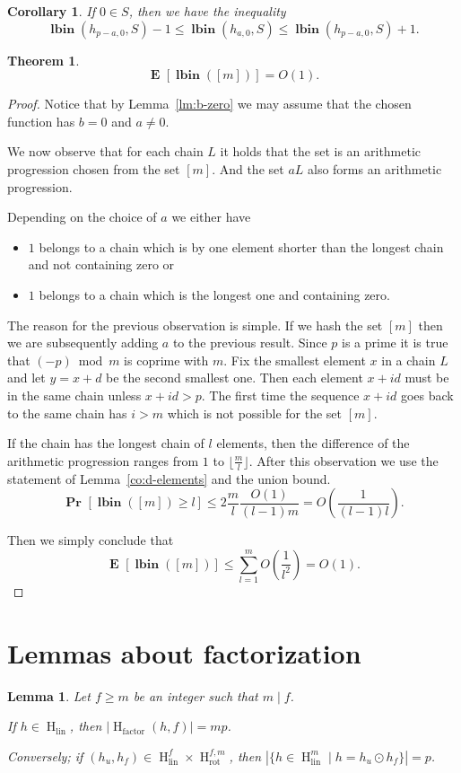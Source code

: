 \documentclass{article}
\newcommand{\hlinr}[1]{\operatorname{H}_{\operatorname{lin}}^{#1}}
\newcommand{\hlin}{\operatorname{H}_{\operatorname{lin}}}
\newcommand{\hfact}[2]{\operatorname{H}_{\operatorname{factor}}({#1}, {#2})}
\newcommand{\rot}[2]{\operatorname{H}_{\operatorname{rot}}^{{#1}, {#2}}}
\newcommand{\lbin}[2]{\operatorname{\mathbf{lbin}}({#1}, {#2})}
\newcommand{\vlbin}[1]{\operatorname{\mathbf{lbin}}({#1})}
\newcommand{\probs}[2]{\operatorname{\mathbf{Pr}}_{{#1}}\left[{#2}\right]}
\newcommand{\prob}[1]{\probs{}{#1}}
\newcommand{\expects}[2]{\operatorname{\mathbf{E}}_{{#1}}\left[{#2}\right]}
\newcommand{\expect}[1]{\expects{}{#1}}
\newtheorem{lemma}{Lemma}
\newtheorem{theorem}{Theorem}
\newtheorem{corollary}{Corollary}
\begin{document}
\begin{corollary}
If $0 \in S$, then we have the inequality
\[
\lbin{h_{p - a, 0}}{S} -1 \leq  \lbin{h_{a, 0}}{S} \leq \lbin{h_{p - a, 0}}{S} + 1.
\]
\end{corollary}

\begin{theorem}
\[
\expect{\vlbin{[m]}} = O(1).
\]
\end{theorem}
\begin{proof}
Notice that by Lemma~\ref{lm:b-zero} we may assume that the chosen function has $b = 0$ and $a \neq 0$.

We now observe that for each chain $L$ it holds that the set is an arithmetic progression chosen from the set $[m]$.
And the set $aL$ also forms an arithmetic progression.

Depending on the choice of $a$ we either have
\begin{itemize}
  \item $1$ belongs to a chain which is by one element shorter than the longest chain and not containing zero or
  \item $1$ belongs to a chain which is the longest one and containing zero.
\end{itemize}

The reason for the previous observation is simple. If we hash the set $[m]$ then we are subsequently adding $a$ to the previous result.
Since $p$ is a prime it is true that $(-p) \bmod m$ is coprime with $m$.
Fix the smallest element $x$ in a chain $L$ and let $y = x + d$ be the second smallest one.
Then each element $x + id$ must be in the same chain unless $x + id > p$.
The first time the sequence $x + id$ goes back to the same chain has $i > m$ which is not possible for the set $[m]$.

If the chain has the longest chain of $l$ elements, then the difference of the arithmetic progression ranges from $1$ to $\lfloor \frac{m}{l} \rfloor$.
After this observation we use the statement of Lemma~\ref{co:d-elements} and the union bound.
\[
\prob{\vlbin{[m]} \geq l} \leq 2 \frac{m}{l} \frac{O(1)}{(l - 1)m} = O\left(\frac{1}{(l - 1)l}\right).
\]

Then we simply conclude that
\[
\expect{\vlbin{[m]}} \leq \sum_{l = 1}^m O\left(\frac{1}{l^2}\right) = O(1).
\]

\end{proof}


\section{Lemmas about factorization}
\begin{lemma}
Let $f \geq m$ be an integer such that $m \mid f$.

If $h \in \hlin$, then $|\hfact{h}{f}| = m p$.

Conversely; if $(h_u, h_f) \in \hlinr{f} \times \rot{f}{m}$, then $|\{h \in \hlinr{m} \mid h = h_u \odot h_f \}| = p$.
\end{lemma}
\end{document}
